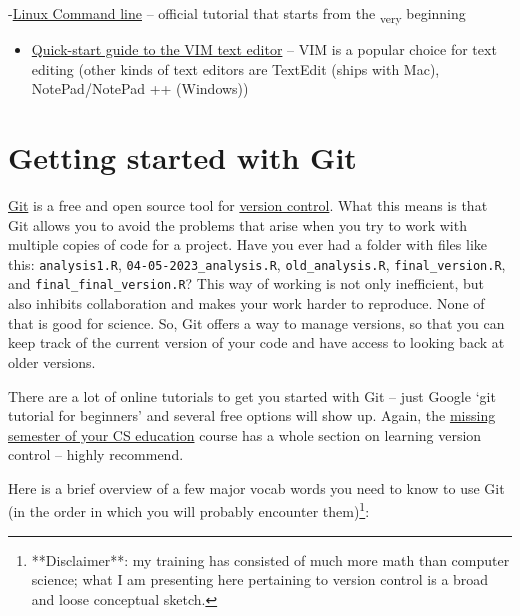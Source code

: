 \documentclass[
]{book}
\providecommand{\tightlist}{%
  \setlength{\itemsep}{0pt}\setlength{\parskip}{0pt}}
\begin{document}
-\href{http://linuxcommand.org/}{Linux Command line} -- official tutorial that starts from the \textsubscript{very} beginning

\begin{itemize}
\tightlist
\item
  \href{https://eastmanreference.com/a-quick-start-guide-for-beginners-to-the-vim-text-editor}{Quick-start guide to the VIM text editor} -- VIM is a popular choice for text editing (other kinds of text editors are TextEdit (ships with Mac), NotePad/NotePad ++ (Windows))
\end{itemize}

\hypertarget{getting-started-with-git}{%
\section{Getting started with Git}\label{getting-started-with-git}}

\href{https://git-scm.com/}{Git} is a free and open source tool for \href{https://en.wikipedia.org/wiki/Version_control}{version control}. What this means is that Git allows you to avoid the problems that arise when you try to work with multiple copies of code for a project. Have you ever had a folder with files like this: \texttt{analysis1.R}, \texttt{04-05-2023\_analysis.R}, \texttt{old\_analysis.R}, \texttt{final\_version.R}, and \texttt{final\_final\_version.R}? This way of working is not only inefficient, but also inhibits collaboration and makes your work harder to reproduce. None of that is good for science. So, Git offers a way to manage versions, so that you can keep track of the current version of your code and have access to looking back at older versions.

There are a lot of online tutorials to get you started with Git -- just Google `git tutorial for beginners' and several free options will show up. Again, the \href{https://missing.csail.mit.edu/2020/version-control/}{missing semester of your CS education} course has a whole section on learning version control -- highly recommend.

Here is a brief overview of a few major vocab words you need to know to use Git (in the order in which you will probably encounter them)\footnote{**Disclaimer**: my training has consisted of much more math than computer science; what I am presenting here pertaining to version control is a broad and loose conceptual sketch.}:
\end{document}
